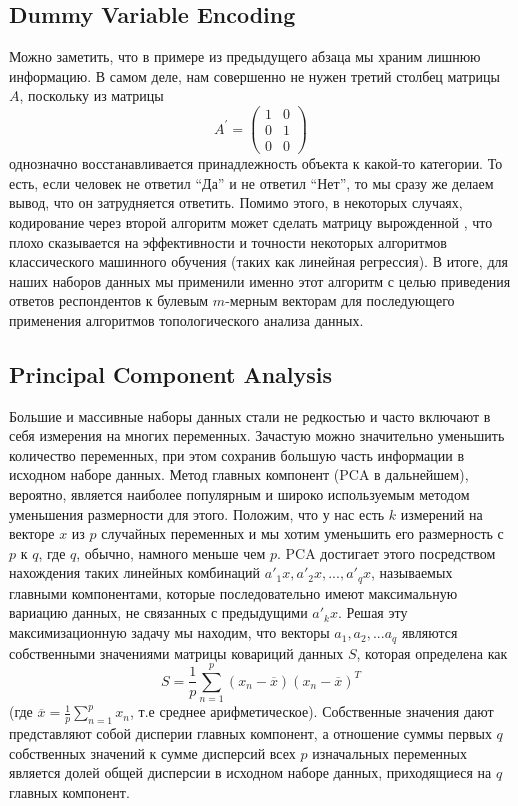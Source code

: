 \subsection{Dummy Variable Encoding}

Можно заметить, что в примере из предыдущего абзаца мы храним лишнюю информацию.
В самом деле, нам совершенно не нужен третий столбец матрицы $A$, поскольку из матрицы
\[
    A^{\prime} = \begin{pmatrix}
        1 & 0 \\
        0 & 1 \\
        0 & 0
    \end{pmatrix}
\]
однозначно восстанавливается принадлежность объекта к какой-то категории.
То есть, если человек не ответил \enquote{Да} и не ответил \enquote{Нет}, то мы сразу же делаем вывод, что он затрудняется ответить.
Помимо этого, в некоторых случаях, кодирование через второй алгоритм может сделать матрицу вырожденной \cite{feature-eng-sel}, что плохо сказывается на эффективности и точности некоторых алгоритмов классического машинного обучения (таких как линейная регрессия).
В итоге, для наших наборов данных мы применили именно этот алгоритм с целью приведения ответов респондентов к булевым $m$-мерным векторам для последующего применения алгоритмов топологического анализа данных.
\subsection{Principal Component Analysis}

Большие и массивные наборы данных стали не редкостью и часто включают в себя измерения на многих переменных. 
Зачастую можно значительно уменьшить количество переменных, при этом сохранив большую часть информации в исходном наборе данных. 
Метод  главных компонент (PCA в дальнейшем), вероятно, является наиболее популярным и широко используемым методом уменьшения размерности для этого. 
Положим, что у нас есть $k$ измерений на векторе $x$ из $p$ случайных переменных и мы хотим уменьшить его размерность с $p$ к $q$, где $q$, обычно, намного меньше чем $p$. 
PCA достигает этого посредством нахождения таких линейных комбинаций $a'_1x, a'_2x, ..., a'_qx$, называемых главными компонентами, которые последовательно имеют максимальную вариацию данных, не связанных с предыдущими $a'_kx$.
Решая эту максимизационную задачу мы находим, что векторы $a_1, a_2, ... a_q$ являются собственными значениями матрицы ковариций данных $S$, которая определена как 
\[
    S = \frac{1}{p} \sum_{n = 1}^p(x_n - \overline{x})(x_n - \overline{x})^T
\]
(где $\overline{x} = \frac{1}{p}\sum_{n = 1}^p x_n$, т.е среднее арифметическое).
Собственные значения дают представляют собой дисперии главных компонент, а отношение суммы первых $q$ собственных значений к сумме дисперсий всех $p$ изначальных переменных является долей общей дисперсии в исходном наборе данных, приходящиеся на $q$ главных компонент.

